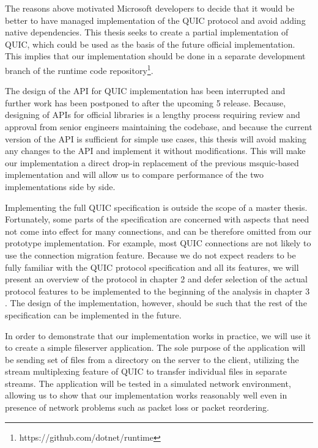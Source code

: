 The reasons above motivated Microsoft developers to decide that it would be better to have managed
implementation of the QUIC protocol and avoid adding native dependencies. This thesis seeks to
create a partial implementation of QUIC, which could be used as the basis of the future official
\dotnet{} implementation. This implies that our implementation should be done in a separate
development branch of the  \dotnet{} runtime code
repository\footnote{https://github.com/dotnet/runtime}. 

The design of the API for \dotnet{} QUIC implementation has been interrupted and further work has
been postponed to after the upcoming \dotnet{} 5 release. Because, designing of APIs for official
\dotnet{} libraries is a lengthy process requiring review and approval from senior engineers
maintaining the codebase, and because the current version of the API is sufficient for simple use
cases, this thesis will avoid making any changes to the API and implement it without modifications.
This will make our implementation a direct drop-in replacement of the previous msquic-based
implementation and will allow us to compare performance of the two implementations side by side.

Implementing the full QUIC specification is outside the scope of a master thesis. Fortunately, some
parts of the specification are concerned with aspects that need not come into effect for many
connections, and can be therefore omitted from our prototype implementation. For example, most QUIC
connections are not likely to use the connection migration feature. Because we do not expect readers
to be fully familiar with the QUIC protocol specification and all its features, we will present an
overview of the protocol in chapter 2  and defer selection of the actual protocol
features to be implemented to the beginning of the analysis in chapter 3 . The design of
the implementation, however, should be such that the rest of the specification can be implemented in
the future.



In order to demonstrate that our implementation works in practice, we will use it to create a simple
fileserver application. The sole purpose of the application will be sending set of files from a
directory on the server to the client, utilizing the stream multiplexing feature of QUIC to transfer
individual files in separate streams. The application will be tested in a simulated network
environment, allowing us to show that our implementation works reasonably well even in presence of
network problems such as packet loss or packet reordering.

